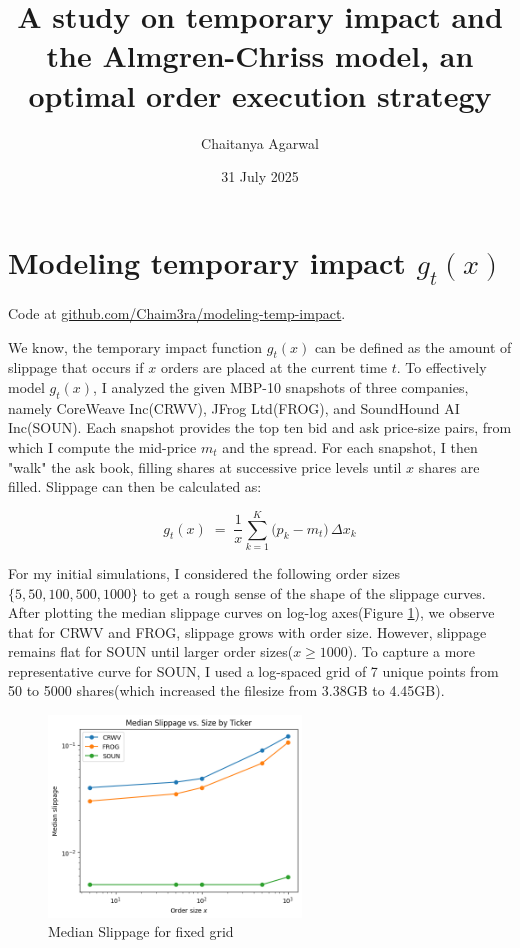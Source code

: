 \documentclass[12pt, letterpaper]{article}
\title{A study on temporary impact and the Almgren-Chriss model, an optimal order execution strategy}
\author{Chaitanya Agarwal}
\date{31 July 2025}
\begin{document}
\maketitle


\section{Modeling temporary impact $g_t(x)$}

\vspace{-0.3em}

Code at 
\href{https://github.com/Chaim3ra/modeling-temp-impact}{github.com/Chaim3ra/modeling-temp-impact}.


\vspace{1em}

We know, the temporary impact function $g_t(x)$ can be defined as the amount of slippage that occurs if $x$ orders are placed at the current time $t$. To effectively model $g_t(x)$, I analyzed the given MBP-10 snapshots of three companies, namely CoreWeave Inc(CRWV), JFrog Ltd(FROG), and SoundHound AI Inc(SOUN). Each snapshot provides the top ten bid and ask price-size pairs, from which I compute the mid-price $m_t$ and the spread. For each snapshot, I then "walk" the ask book, filling shares at successive price levels until \(x\) shares are filled. Slippage can then be calculated as:

\[g_t(x) \;=\;\frac{1}{x}\sum_{k=1}^{K}\bigl(p_k - m_t\bigr)\,\Delta x_k\]



For my initial simulations, I considered the following order sizes \newline $\{5, 50, 100, 500, 1000\}$ to get a rough sense of the shape of the slippage curves. After plotting the median slippage curves on log-log axes(Figure \ref{fig:slippage_fixed_grid}), we observe that for CRWV and FROG, slippage grows with order size. 
However, slippage remains flat for SOUN until larger order sizes($x  \geq 1000$). To capture a more representative curve for SOUN, I used a log-spaced grid of 7 unique points from 50 to 5000 shares(which increased the filesize from 3.38GB to 4.45GB).



\begin{figure}[h!] %
    \centering
    \includegraphics[width=0.6\textwidth]{res/images/median_slippage_small_grid.png} %
    \caption{Median Slippage for fixed grid}
    \label{fig:slippage_fixed_grid}
\end{figure}
\end{document}
